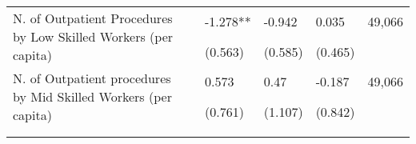 \begin{table}[H]
\begin{footnotesize}
\begin{center}
{\begin{threeparttable}[b]
\begin{tabular}{rrrrrr}
    \multicolumn{1}{l}{\multirow{2}[0]{*}{N. of Outpatient Procedures by Low Skilled Workers (per capita)}} &       & \multicolumn{1}{l}{-1.278**} & \multicolumn{1}{l}{-0.942} & \multicolumn{1}{l}{0.035} & \multicolumn{1}{c}{     49,066 } \\
          &       & \multicolumn{1}{l}{(0.563)} & \multicolumn{1}{l}{(0.585)} & \multicolumn{1}{l}{(0.465)} &  \\
    \multicolumn{1}{l}{\multirow{2}[0]{*}{N. of Outpatient procedures by Mid Skilled Workers (per capita)}} &       & \multicolumn{1}{l}{0.573} & \multicolumn{1}{l}{0.47} & \multicolumn{1}{l}{-0.187} & \multicolumn{1}{c}{     49,066 } \\
          &       & \multicolumn{1}{l}{(0.761)} & \multicolumn{1}{l}{(1.107)} & \multicolumn{1}{l}{(0.842)} &  \\
          &       &       &       &       &  \\
    \midrule
    \midrule
          &       &       &       &       &  \\
    \end{tabular}%
    
  \label{table:ambulatorial}%

\end{threeparttable}
}
\end{center}
\end{footnotesize}
\end{table}
